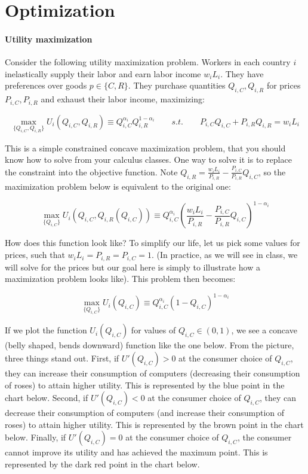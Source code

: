 \documentclass[11pt,letterpaper]{article}
\begin{document}
\section{Optimization}

\paragraph{Utility maximization} Consider the following utility maximization problem. Workers in each country $i$ inelastically supply their labor and earn labor income $w_i L_i$. They have preferences over goods $p \in \{ C, R\}$. They purchase quantities $Q_{i,C}, Q_{i,R}$ for prices $P_{i,C}, P_{i,R}$ and exhaust their labor income, maximizing:

\begin{equation*}
    \max_{\{Q_{i,C}, Q_{i,R}\}} U_i(Q_{i,C}, Q_{i,R}) \equiv Q_{i,C}^{\alpha_i} Q_{i,R}^{1-\alpha_i} \qquad s.t. \qquad P_{i,C} Q_{i,C} + P_{i,R} Q_{i,R} = w_i L_i
\end{equation*}

This is a simple constrained concave maximization problem, that you should know how to solve from your calculus classes. One way to solve it is to replace the constraint into the objective function. Note $Q_{i,R} = \frac{w_i L_i}{P_{i,R}} - \frac{P_{i,C}}{P_{i,R} } Q_{i,C}$, so the maximization problem below is equivalent to the original one:

\begin{equation*}
    \max_{\{Q_{i,C}\}} U_i(Q_{i,C}, Q_{i,R}(Q_{i,C})) \equiv Q_{i,C}^{\alpha_i} \left( \frac{w_i L_i}{P_{i,R}} - \frac{P_{i,C}}{P_{i,R} } Q_{i,C} \right)^{1-\alpha_i}
\end{equation*}

How does this function look like? To simplify our life, let us pick some values for prices, such that $w_iL_i=P_{i,R}=P_{i,C}=1$. (In practice, as we will see in class, we will solve for the prices but our goal here is simply to illustrate how a maximization problem looks like). This problem then becomes:


\begin{equation*}
    \max_{\{Q_{i,C}\}} U_i(Q_{i,C}) \equiv Q_{i,C}^{\alpha_i} \left( 1 - Q_{i,C} \right)^{1-\alpha_i}
\end{equation*}

If we plot the function $U_i(Q_{i,C})$ for values of $Q_{i,C} \in (0,1)$, we see a concave (belly shaped, bends downward) function like the one below. From the picture, three things stand out. First, if $U'(Q_{i,C}) >0$ at the consumer choice of $Q_{i,C}$, they can increase their consumption of computers (decreasing their consumption of roses) to attain higher utility. This is represented by the blue point in the chart below. Second, if $U'(Q_{i,C}) < 0$ at the consumer choice of $Q_{i,C}$, they can decrease their consumption of computers (and increase their consumption of roses) to attain higher utility. This is represented by the brown point in the chart below. Finally, if $U'(Q_{i,C}) = 0$ at the consumer choice of $Q_{i,C}$, the consumer cannot improve its utility and has achieved the maximum point. This is represented by the dark red point in the chart below.
\end{document}

